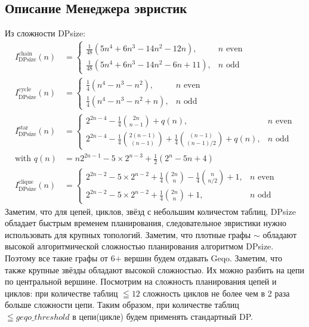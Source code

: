 \documentclass[12pt]{article}
\begin{document}
\begin{flushleft}
\section*{Описание Менеджера эвристик}
Из сложности DPsize:
\begin{align*}
    I^{\text{chain}}_{\text{DPsize}}(n) &=
    \begin{cases}
        \frac{1}{48} (5n^4 + 6n^3 - 14n^2 - 12n), & n \text{ even} \\
        \frac{1}{48} (5n^4 + 6n^3 - 14n^2 - 6n + 11), & n \text{ odd}
    \end{cases}
    \\
    I^{\text{cycle}}_{\text{DPsize}}(n) &=
    \begin{cases}
        \frac{1}{4} (n^4 - n^3 - n^2), & n \text{ even} \\
        \frac{1}{4} (n^4 - n^3 - n^2 + n), & n \text{ odd}
    \end{cases}
    \\
    I^{\text{star}}_{\text{DPsize}}(n) &=
    \begin{cases}
        2^{2n-4} - \frac{1}{4} \binom{2n}{n-1} + q(n), & n \text{ even} \\
        2^{2n-4} - \frac{1}{4} \binom{2(n-1)}{(n-1)} + \frac{1}{4} \binom{(n-1)}{(n-1)/2} + q(n), & n \text{ odd}
    \end{cases}
    \\
    \text{with } q(n) &= n 2^{2n-1} - 5 \times 2^{n-3} + \frac{1}{2} (2^n - 5n + 4)
    \\
    I^{\text{clique}}_{\text{DPsize}}(n) &=
    \begin{cases}
        2^{2n-2} - 5 \times 2^{n-2} + \frac{1}{4} \binom{2n}{n} - \frac{1}{4} \binom{n}{n/2} + 1, & n \text{ even} \\
        2^{2n-2} - 5 \times 2^{n-2} + \frac{1}{4} \binom{2n}{n} + 1, & n \text{ odd}
    \end{cases}
\end{align*}
Заметим, что для цепей, циклов, звёзд с небольшим количестом таблиц, DPsize обладает быстрым временем планирования, следовательное эвристики нужно использовать для крупных топологий.
Заметим, что плотные графы $\sim$  обладают высокой алгоритмической сложностью планирования
алгоритмом DPsize. Поэтому все такие графы от 6+ вершин будем отдавать Geqo. 
Заметим, что также крупные звёзды обладают высокой сложностью. Их можно разбить на цепи по центральной вершине.
Посмотрим на сложность планирования цепей и циклов: при количестве таблиц $\leqq 12$ сложность циклов не более чем в 2 раза 
больше сложности цепи. Таким образом, при количестве таблиц $\leqq geqo\_threshold$ в цепи(цикле) будем применять стандартный DP.


\end{flushleft}
\end{document}
